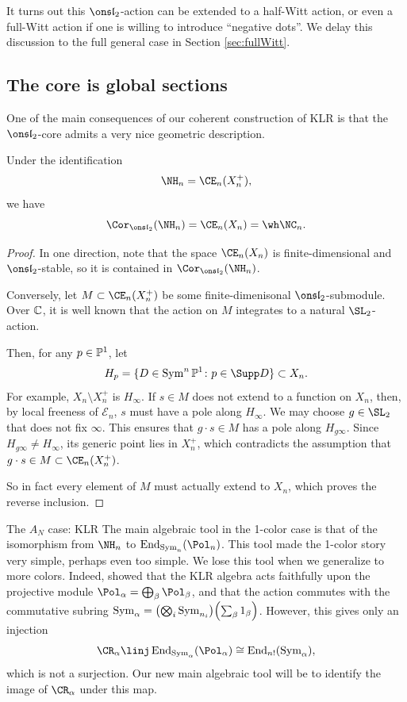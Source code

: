 \documentclass[11pt,reqno]{amsart}
\makeatletter
\def\part{\@startsection{part}{0}%
  \z@{\linespacing\@plus\linespacing}{.5\linespacing}%
  {\normalfont\large\scshape\centering}} %
\makeatother
\begin{document}
It turns out this $\sl_2$-action can be extended to a half-Witt action, or even a full-Witt action if one is willing to introduce ``negative dots''. We delay this discussion to the full general case in Section \ref{sec:fullWitt}.  

\subsection{The core is global sections}
One of the main consequences of our coherent construction of KLR is that the $\sl_2$-core admits a very nice geometric description.
\begin{theorem}
Under the identification \[\NH_n=\CE_n(X_n^+),\] we have \[\Cor_{\sl_2}(\NH_n)=\CE_n(X_n)=\wh\NC_n.\]
\end{theorem}

\begin{proof}
In one direction, note that the space $\CE_n(X_n)$ is finite-dimensional and $\sl_2$-stable, so it is contained in $\Cor_{\sl_2}(\NH_n)$. 

Conversely, let $M\subset\CE_n(X_n^+)$ be some finite-dimenisonal $\sl_2$-submodule. Over $\mathbb C$, it is well known that the action on $M$ integrates to a natural $\SL_2$-action. 

Then, for any $p\in \mathbb P^1$, let \[H_p=\{D\in \Sym^n\BP^1\colon p\in \Supp D\}\subset X_n.\] For example, $X_n\setminus X_n^+$ is $H_\infty$. If $s\in M$ does not extend to a function on $X_n$, then, by local freeness of $\mathcal{E}_n$, $s$ must have a pole along $H_\infty$. We may choose $g\in \SL_2$ that does not fix $\infty$. This ensures that $g\cdot s\in M$ has a pole along $H_{g\infty}$. Since $H_{g\infty}\ne H_\infty$, its generic point lies in $X_n^+$, which contradicts the assumption that $g\cdot s\in M \subset \CE_n(X_n^+)$. 

So in fact every element of $M$ must actually extend to $X_n$, which proves the reverse inclusion.
\end{proof}


\part{The $A_N$ case: KLR}\label{part:II}
The main algebraic tool in the 1-color case is that of the isomorphism from $\NH_n$ to $\End_{\Sym_n}(\Pol_n)$. This tool made the 1-color story very simple, perhaps even too simple. We lose this tool when we generalize to more colors. Indeed, \cite{KL09} showed that the KLR algebra acts faithfully upon the projective module $\Pol_\alpha=\bigoplus_\beta \Pol_\beta$, and that the action commutes with the commutative subring $\Sym_\alpha=\pr*{\bigotimes_i \Sym_{n_i}}\pr*{\sum_\beta 1_\beta}$. However, this gives only an injection
\[\CR_\alpha\linj \End_{\Sym_\alpha}(\Pol_\alpha)\cong\End_{n!}(\Sym_\alpha),\] 
which is not a surjection. Our new main algebraic tool will be to identify the image of $\CR_\alpha$ under this map.
\end{document}

